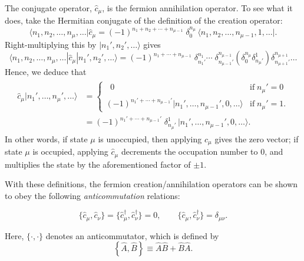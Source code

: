 \documentclass[prx,12pt]{revtex4-2}
\begin{document}
The conjugate operator, $\hat{c}_\mu$, is the fermion annihilation
operator.  To see what it does, take the Hermitian conjugate of the
definition of the creation operator:
\begin{equation}
  \langle n_1, n_2, \dots, n_\mu,\dots| \hat{c}_\mu  =
  (-1)^{n_1 + n_2 + \cdots + n_{\mu-1}}\; \delta^{n_\mu}_0\, \big\langle n_1, n_2, \dots, n_{\mu-1}, 1, \dots\big|.
\end{equation}
Right-multiplying this by $|n_1',n_2',\dots\rangle$ gives
\begin{equation}
  \langle n_1, n_2, \dots, n_\mu,\dots| \hat{c}_\mu |n_1', n_2', \dots\rangle  = (-1)^{n_1 + \cdots + n_{\mu-1}} \;\delta^{n_1}_{n_1'} \cdots \;\delta^{n_{\mu-1}}_{n_{\mu-1}'} \left(\delta^{n_\mu}_0 \delta^1_{n_\mu'} \right) \delta^{n_{\mu+1}}_{n_{\mu+1}'} \dots
\end{equation}
Hence, we deduce that
\begin{align}
  \begin{aligned}\hat{c}_\mu |n_1', \dots, n_\mu',\dots\rangle &= \begin{cases} \;\;0 & \mathrm{if}\; n_\mu' = 0 \\ (-1)^{n_1' + \cdots + n_{\mu-1}'} |n_1', \dots, n_{\mu-1}', 0, \dots\rangle & \mathrm{if} \; n_\mu' = 1. \end{cases} \\ &= (-1)^{n_1' + \cdots + n_{\mu-1}'} \; \delta^1_{n_\mu'} \, \big|n_1', \dots, n_{\mu-1}', 0, \dots\big\rangle.\end{aligned}
\end{align}
In other words, if state $\mu$ is unoccupied, then applying
$\hat{c}_\mu$ gives the zero vector; if state $\mu$ is occupied,
applying $\hat{c}_\mu$ decrements the occupation number to $0$, and
multiplies the state by the aforementioned factor of $\pm 1$.

With these definitions, the fermion creation/annihilation operators
can be shown to obey the following \textit{anticommutation} relations:
\begin{framed}
  \begin{equation}
    \big\{\hat{c}_\mu,\hat{c}_\nu\big\} = \big\{\hat{c}_\mu^\dagger,\hat{c}_\nu^\dagger\big\} = 0, \qquad \big\{\hat{c}_\mu,\hat{c}_\nu^\dagger\big\} = \delta_{\mu\nu}.
    \label{anticommutation}
  \end{equation}
\end{framed}
\vskip -0.15in
\noindent
Here, $\{\cdot,\cdot\}$ denotes an anticommutator, which is defined by
\begin{equation}
  \left\{\hat{A},\hat{B}\right\} \equiv \hat{A}\hat{B} + \hat{B}\hat{A}.
\end{equation}
\end{document}
